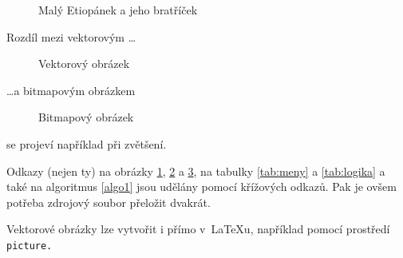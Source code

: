 \documentclass[a4paper, 11pt]{article}
\begin{document}
\begin{figure}[h]
\begin{center}
\caption{Malý Etiopánek a jeho bratříček}\label{fig:etiopanek}
				\end{center}
			\end{figure}
						
			Rozdíl mezi vektorovým \dots
						
			\begin{figure}[h]
				\begin{center}
					\caption{Vektorový obrázek}\label{fig:oniisan1}
				\end{center}
			\end{figure}
			\noindent\dots a bitmapovým obrázkem
						
			\begin{figure}[h]
				\begin{center}
					\caption{Bitmapový obrázek}\label{fig:oniisan2}
				\end{center}
			\end{figure}
			\noindent se projeví například při zvětšení.
						
			Odkazy (nejen ty) na obrázky \ref*{fig:etiopanek}, \ref*{fig:oniisan1} a \ref*{fig:oniisan2}, na tabulky \ref*{tab:meny} a \ref*{tab:logika} a také na algoritmus \ref*{algo1} jsou udělány pomocí křížových
			odkazů. Pak je ovšem potřeba zdrojový soubor přeložit dvakrát.
						
			Vektorové obrázky lze vytvořit i přímo v~\LaTeX u, například pomocí prostředí\texttt{ picture.}
						
\end{document}
